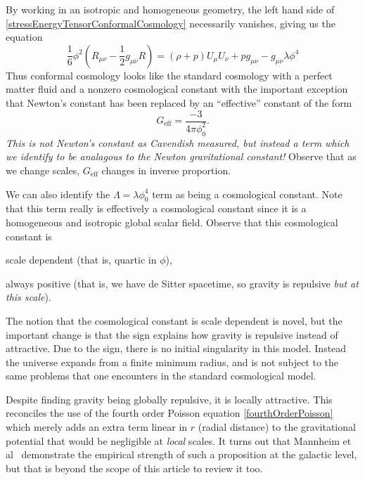 By working in an isotropic and homogeneous geometry, the left hand side of
\eqref{stressEnergyTensorConformalCosmology} necessarily
vanishes, giving us the equation
\begin{equation}
\frac{1}{6}\phi^{2}\left(R_{\mu\nu} -
\frac{1}{2}g_{\mu\nu}R\right) = (\rho + p)U_{\mu}U_{\nu} +
pg_{\mu\nu}  - g_{\mu\nu}\lambda \phi^{4}
\end{equation}
Thus conformal cosmology looks like the standard cosmology with a
perfect matter fluid and a nonzero cosmological constant with the
important exception that Newton's constant has been replaced by
an ``effective'' constant of the form 
\begin{equation}
G_\text{eff} = \frac{-3}{4\pi \phi_{0}^{2}}.
\end{equation}
\emph{This is not Newton's constant as Cavendish measured, but instead
a term which we identify to be analagous to the Newton gravitational
constant!} Observe that as we change scales, $G_\text{eff}$ changes in inverse
proportion. 

We can also identify the $\Lambda = \lambda \phi_{0}^{4}$ term as being a
cosmological constant. Note that this term really is effectively a
cosmological constant since it is a homogeneous and isotropic global
scalar field. Observe that this cosmological constant
is \begin{inparaenum}
\item scale dependent (that is, quartic in $\phi$),
\item always positive (that is, we have de Sitter spacetime, so
gravity is repulsive \emph{but at this scale}).
\end{inparaenum}
The notion that the cosmological constant is scale dependent is novel,
but the important change is that the sign explains how gravity is
repulsive instead of attractive. Due to the sign, there is no initial
singularity in this model. Instead the universe expands from a finite
minimum radius, and is not subject to the same problems that one
encounters in the standard cosmological model.

Despite finding gravity being globally repulsive, it is locally
attractive. This reconciles the use of the fourth order Poisson
equation \eqref{fourthOrderPoisson} which merely adds an extra term linear in $r$
(radial distance) to the gravitational potential that would be
negligible at \emph{local} scales. It turns out that Mannheim et
al~\cite{Mannheim:1996jt} demonstrate the empirical strength of such a
proposition at the galactic level, but that is beyond the scope of
this article to review it too.
